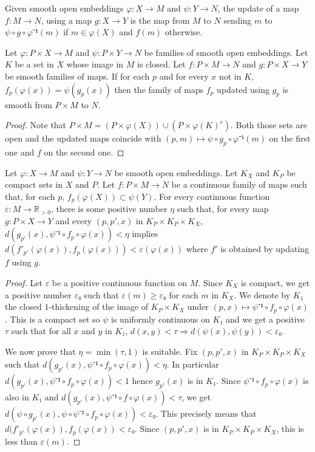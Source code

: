 \documentclass[10pt,a4paper]{article}
\newcommand{\uses}[1]{}
\newcommand{\lean}[1]{}
\newcommand{\leanok}{}
\begin{document}
\begin{definition}
  \label{def:update}
  \lean{OpenSmoothEmbedding.update}
  \leanok
  Given smooth open embeddings $φ : X → M$ and $ψ : Y → N$, the update of a map
  $f : M → N$, using a map $g : X → Y$
  is the map from $M$ to $N$ sending $m$ to $ψ ∘ g ∘ φ⁻¹(m)$ if
  $m ∈ φ(X)$ and $f(m)$ otherwise.
\end{definition}

\begin{lemma}
  \label{lem:smooth_updating}
  \uses{def:update}
  \lean{OpenSmoothEmbedding.contMDiff_update}
  \leanok
  Let $φ : P × X → M$ and $ψ : P × Y → N$ be families of smooth open embeddings.
  Let $K$ be a set in $X$ whose image in $M$ is closed. Let $f : P × M → N$
  and $g : P × X → Y$ be
  smooth families of maps. If for each $p$ and for every $x$ not in $K$,
  $f_p(φ(x)) = ψ(g_p(x))$ then the family of maps $f_p$ updated using $g_p$ is
  smooth from $P × M$ to $N$.
\end{lemma}

\begin{proof}
  \leanok
  Note that $P × M = (P × φ(X)) ∪ (P × φ(K)^c)$. Both
  those sets are open and the updated maps coincide with
  $(p, m) ↦ ψ ∘ g_p ∘ φ⁻¹(m)$ on the first one and $f$ on the second one.
\end{proof}

\begin{lemma}
  \label{lem:dist_updating}
  \uses{def:update}
  \lean{OpenSmoothEmbedding.dist_update}
  \leanok
  Let $φ : X → M$ and $ψ : Y → N$ be smooth open embeddings.
  Let $K_X$ and $K_P$ be compact sets in $X$ and $P$.
  Let $f : P × M → N$ be a continuous family of
  maps such that, for each $p$, $f_p(φ(X)) ⊂ ψ(Y)$.
  For every continuous function $ε : M → ℝ_{> 0}$, there is some positive
  number $η$ such that, for every map $g : P × X → Y$ and every $(p, p', x)$ in
  $K_P × K_P × K_X$, $d(g_{p'}(x), ψ⁻¹∘f_p∘φ(x)) < η$ implies
  $d(f'_{p'}(φ(x)), f_p(φ(x))) < ε(φ(x))$ where $f'$ is obtained by updating $f$
  using $g$.
\end{lemma}

\begin{proof}
  \leanok
  Let $ε$ be a positive continuous function on $M$. Since $K_X$ is compact, we get
  a positive number $ε₀$ such that $ε(m) ≥ ε₀$ for each $m$ in $K_X$. We denote by
  $K₁$ the closed $1$-thickening of the image of $K_P × K_X$ under
  $(p, x) ↦ ψ⁻¹∘f_p∘φ(x)$. This is a compact set
  so $ψ$ is uniformly continuous on $K₁$ and we get a positive $τ$ such that
  for all $x$ and $y$ in $K₁$, $d(x, y) < τ ⇒ d(ψ(x), ψ(y)) < ε₀$.

  We now prove that $η = \min(τ, 1)$ is suitable. Fix $(p, p', x)$ in
  $K_P × K_P × K_X$ such that $d(g_{p'}(x), ψ⁻¹∘f_p∘φ(x)) < η$.
  In particular $d(g_{p'}(x), ψ⁻¹∘f_p∘φ(x)) < 1$ hence $g_{p'}(x)$ is in $K₁$. Since
  $ψ⁻¹∘f_p∘φ(x)$ is also in $K₁$ and $d(g_{p'}(x), ψ⁻¹∘f∘φ(x)) < τ$, we get
  $d(ψ∘ g_{p'}(x), ψ ∘ ψ⁻¹∘f_p∘φ(x)) < ε₀$. This precisely means that
  $d(f'_{p'}(φ(x)), f_p(φ(x)) < ε₀$. Since $(p, p', x)$ is in $K_P × K_P × K_X$,
  this is less than $ε(m)$.
\end{proof}
\end{document}
